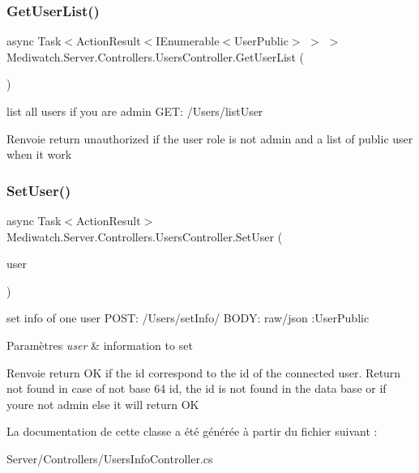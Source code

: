 \subsubsection{\texorpdfstring{Get\+User\+List()}{GetUserList()}}
{\footnotesize\ttfamily async Task$<$Action\+Result$<$I\+Enumerable$<$User\+Public$>$ $>$ $>$ Mediwatch.\+Server.\+Controllers.\+Users\+Controller.\+Get\+User\+List (\begin{DoxyParamCaption}{ }\end{DoxyParamCaption})\hspace{0.3cm}{\ttfamily [inline]}}



list all users if you are admin G\+ET\+: /\+Users/list\+User 

\begin{DoxyReturn}{Renvoie}
return unauthorized if the user role is not admin and a list of public user when it work
\end{DoxyReturn}
\mbox{\label{class_mediwatch_1_1_server_1_1_controllers_1_1_users_controller_a414ca2854bf71701319b3c34dbda03ab}} 
\subsubsection{\texorpdfstring{Set\+User()}{SetUser()}}
{\footnotesize\ttfamily async Task$<$Action\+Result$>$ Mediwatch.\+Server.\+Controllers.\+Users\+Controller.\+Set\+User (\begin{DoxyParamCaption}\item[{User\+Public}]{user }\end{DoxyParamCaption})\hspace{0.3cm}{\ttfamily [inline]}}



set info of one user P\+O\+ST\+: /\+Users/set\+Info/ B\+O\+DY\+: raw/json \+:User\+Public 


\begin{DoxyParams}{Paramètres}
{\em user} & information to set\\
\hline
\end{DoxyParams}
\begin{DoxyReturn}{Renvoie}
return OK if the id correspond to the id of the connected user. Return not found in case of not base 64 id, the id is not found in the data base or if you\textquotesingle{}re not admin else it will return OK
\end{DoxyReturn}


La documentation de cette classe a été générée à partir du fichier suivant \+:\begin{DoxyCompactItemize}
\item 
Server/\+Controllers/Users\+Info\+Controller.\+cs\end{DoxyCompactItemize}
